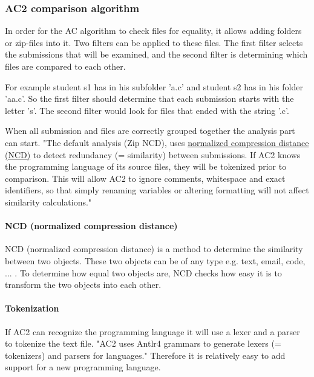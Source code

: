 \documentclass[a4paper, 11pt]{article}
\renewcommand{\\}{\vspace*{0.5\baselineskip} \newline}
\begin{document}
\subsubsection{AC2 comparison algorithm}
\label{sec:AC2ComparisonAlgorithm}

In order for the AC algorithm to check files for equality, it allows adding folders or zip-files into it. Two filters can be applied to these files. The first filter selects the submissions that will be examined, and the second filter is determining which files are compared to each other. 

For example student s1 has in his subfolder 'a.c' and student s2 has in his folder 'aa.c'. So the first filter should determine that each submission starts with the letter 's'. The second filter would look for files that ended with the string '.c'.

When all submission and files are correctly grouped together the analysis part can start. "The default analysis (Zip NCD), uses \hyperref[sec:NCD]{normalized compression distance (NCD)} to detect redundancy (= similarity) between submissions. If AC2 knows the programming language of its source files, they will be tokenized prior to comparison. This will allow AC2 to ignore comments, whitespace and exact identifiers, so that simply renaming variables or altering formatting will not affect similarity calculations." \autocite{AC2wiki} 

\paragraph{NCD (normalized compression distance)}
\label{sec:NCD}

NCD (normalized compression distance) is a method to determine the similarity between two objects. These two objects can be of any type e.g. text, email, code, ... .  To determine how equal two objects are, NCD checks how easy it is to transform the two objects into each other.

\paragraph{Tokenization}

If AC2 can recognize the programming language it will use a lexer and a parser to tokenize the text file. "AC2 uses Antlr4 grammars to generate lexers (= tokenizers) and parsers for languages." \autocite{AC2wiki} Therefore it is relatively easy to add support for a new programming language.
\end{document}
